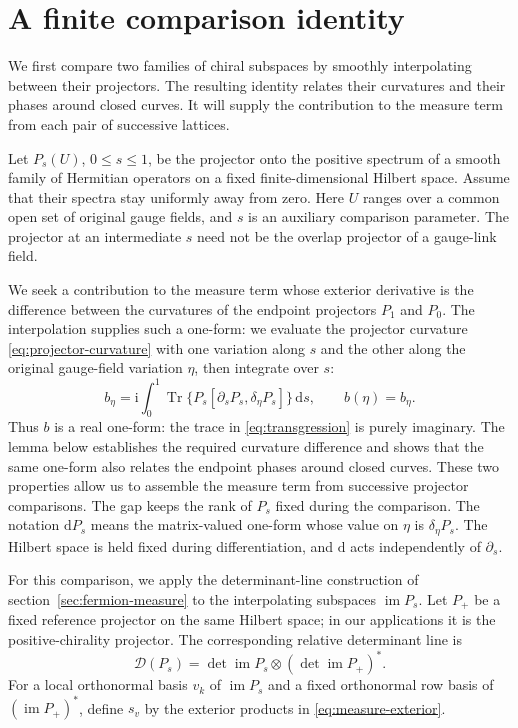 \documentclass[11pt,a4paper]{article}
\theoremstyle{remark}
\DeclareMathOperator{\Tr}{Tr}
\DeclareMathOperator{\im}{im}
\newcommand{\dd}{\mathrm d}
\newcommand{\ii}{\mathrm i}
\begin{document}
\section{A finite comparison identity}
\label{sec:comparison}

We first compare two families of chiral subspaces by smoothly
interpolating between their projectors. The resulting identity
relates their curvatures and their phases around closed curves.
It will supply the contribution to the measure term from each
pair of successive lattices.

Let \(P_s(U)\), \(0\le s\le1\), be the projector onto the positive spectrum of a smooth family of
Hermitian operators on a fixed finite-dimensional Hilbert space.
Assume that their spectra stay uniformly away from zero. Here \(U\) ranges over a common open set of
original gauge fields, and \(s\) is an auxiliary comparison
parameter. The projector at an intermediate \(s\) need not
be the overlap projector of a gauge-link field.

We seek a contribution to the measure term whose exterior
derivative is the difference between the curvatures of
the endpoint projectors \(P_1\) and \(P_0\).
The interpolation supplies such a one-form: we evaluate
the projector curvature \eqref{eq:projector-curvature}
with one variation along \(s\) and the other along the
original gauge-field variation \(\eta\), then integrate
over \(s\):
\begin{equation}
 b_\eta=\ii\int_0^1\Tr\{P_s
             [\partial_sP_s,\delta_\eta P_s]\}\,\dd s,
 \qquad b(\eta)=b_\eta.
 \label{eq:transgression}
\end{equation}
Thus \(b\) is a real one-form: the trace in
\eqref{eq:transgression} is purely imaginary.
The lemma below establishes the required curvature
difference and shows that the same one-form also
relates the endpoint phases around closed curves.
These two properties allow us to assemble the measure
term from successive projector comparisons.
The gap keeps the rank of \(P_s\) fixed during the comparison.
The notation \(\dd P_s\) means the matrix-valued one-form
whose value on \(\eta\) is \(\delta_\eta P_s\).
The Hilbert space is held fixed during differentiation,
and \(\dd\) acts independently of \(\partial_s\).

For this comparison, we apply the determinant-line construction
of section~\ref{sec:fermion-measure} to the interpolating
subspaces \(\im P_s\). Let \(P_+\) be a fixed reference
projector on the same Hilbert space; in our applications
it is the positive-chirality projector. The corresponding
relative determinant line is
\begin{equation}
 \mathcal D(P_s)=\det\im P_s\otimes(\det\im P_+)^*.
\end{equation}
For a local orthonormal basis \(v_k\) of \(\im P_s\)
and a fixed orthonormal row basis of \((\im P_+)^*\),
define \(s_v\) by the exterior products in
\eqref{eq:measure-exterior}.
\end{document}
